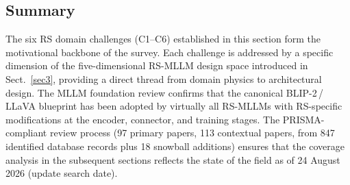 \subsection*{Summary}

The six RS domain challenges (C1--C6) established in this section form the
motivational backbone of the survey. Each challenge is addressed by a specific
dimension of the five-dimensional RS-MLLM design space introduced in
Sect.~\ref{sec3}, providing a direct thread from domain physics to
architectural design. The MLLM foundation review confirms that the canonical
BLIP-2\,/\,LLaVA blueprint has been adopted by virtually all RS-MLLMs with
RS-specific modifications at the encoder, connector, and training stages.
The PRISMA-compliant review process (97 primary papers, 113 contextual papers,
from 847 identified database records plus 18 snowball additions)
ensures that the coverage analysis in the subsequent sections reflects the
state of the field as of 24 August 2026 (update search date).
